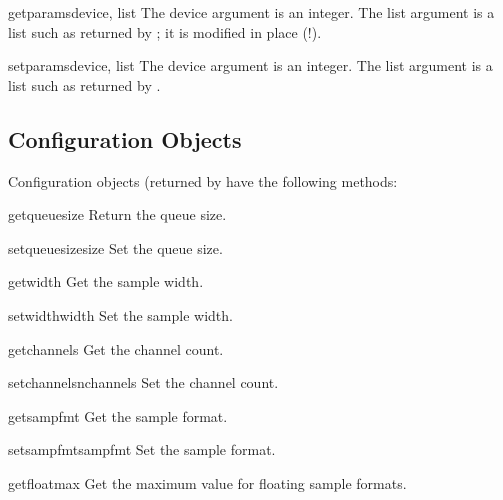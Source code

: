 \begin{funcdesc}{getparams}{device, list}
The device argument is an integer.  The list argument is a list such
as returned by ; it is modified in place (!).
\end{funcdesc}

\begin{funcdesc}{setparams}{device, list}
The device argument is an integer.  The list argument is a list such
as returned by .
\end{funcdesc}

\subsection{Configuration Objects}

Configuration objects (returned by  have the
following methods:


\begin{funcdesc}{getqueuesize}{}
Return the queue size.
\end{funcdesc}

\begin{funcdesc}{setqueuesize}{size}
Set the queue size.
\end{funcdesc}

\begin{funcdesc}{getwidth}{}
Get the sample width.
\end{funcdesc}

\begin{funcdesc}{setwidth}{width}
Set the sample width.
\end{funcdesc}

\begin{funcdesc}{getchannels}{}
Get the channel count.
\end{funcdesc}

\begin{funcdesc}{setchannels}{nchannels}
Set the channel count.
\end{funcdesc}

\begin{funcdesc}{getsampfmt}{}
Get the sample format.
\end{funcdesc}

\begin{funcdesc}{setsampfmt}{sampfmt}
Set the sample format.
\end{funcdesc}

\begin{funcdesc}{getfloatmax}{}
Get the maximum value for floating sample formats.
\end{funcdesc}

